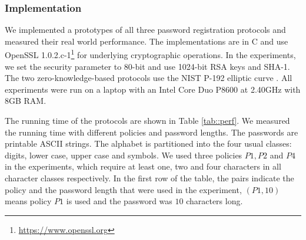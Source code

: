 \subsubsection{Implementation}
We implemented a prototypes of all three password registration protocols and measured their real world performance. 
The implementations are in C and use OpenSSL 1.0.2.c-1\footnote{\url{https://www.openssl.org}} for underlying cryptographic operations. 
In the experiments, we set the security parameter to 80-bit and use 1024-bit RSA keys and \mbox{{SHA-}1}. 
The two zero-knowledge-based protocols use the \ac{NIST} P-192 elliptic curve \cite{nistEC}.
All experiments were run on a laptop with an Intel Core Duo P8600 at 2.40GHz with 8GB RAM.

\begin{table}[!t]
\begin{center}
\caption{Protocol Performance (Running Time in Milliseconds)} \label{tab::perf}
\end{center}
\end{table} 

The running time of the protocols are shown in Table \ref{tab::perf}. We measured the running time with different policies and password lengths. The passwords are printable \ac{ASCII} strings. 
The alphabet is partitioned into the four usual classes: digits, lower case, upper case and symbols. 
We used three policies $P1, P2$ and $P4$ in the experiments, which require at least one, two and four characters in all character classes respectively. 
In the first row of the table, the pairs indicate the policy and the password length that were used in the experiment, \eg $(P1, 10)$ means policy $P1$ is used and the password was $10$ characters long. 

